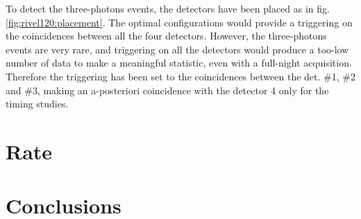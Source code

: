 \documentclass[11pt,a4 paper]{article}
\begin{document}
To detect the three-photons events, the detectors have been placed as in fig. \ref{fig:rivel120:placement}. The optimal configurations would provide a triggering on the coincidences between all the four detectors. However, the three-photons events are very rare, and triggering on all the detectors would produce a too-low number of data to make a meaningful statistic, even with a full-night acquisition. Therefore the triggering has been set to the coincidences between the det. \#1, \#2 and \#3, making an a-posteriori coincidence with the detector 4 only for the timing studies.





\section{Rate}


\section{Conclusions}
\end{document}
